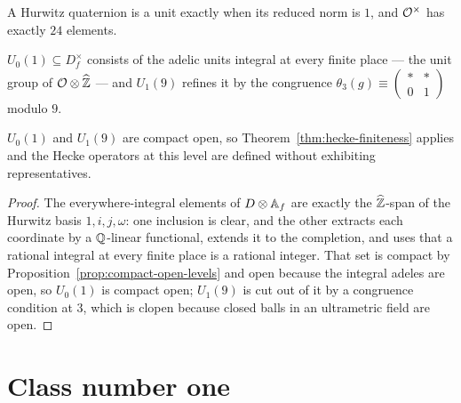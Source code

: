 \begin{proposition}
  \label{prop:hurwitz-units}
  \leanok
  A Hurwitz quaternion is a unit exactly when its reduced norm is $1$, and $\mathcal{O}^\times$ has
  exactly $24$ elements.
\end{proposition}

\begin{definition}
  \label{def:jacobs-levels}
  \leanok
  $U_0(1) \subseteq D_f^\times$ consists of the adelic units integral at every finite place ---
  the unit group of $\mathcal{O} \otimes \widehat{\mathbb{Z}}$ --- and $U_1(9)$ refines it by the congruence
  $\theta_3(g) \equiv \left(\begin{smallmatrix} * & * \\ 0 & 1\end{smallmatrix}\right)$ modulo
  $9$.
\end{definition}

\begin{proposition}
  \label{prop:jacobs-levels-compact-open}
  \leanok
  $U_0(1)$ and $U_1(9)$ are compact open, so Theorem~\ref{thm:hecke-finiteness} applies and the
  Hecke operators at this level are defined without exhibiting representatives.
\end{proposition}

\begin{proof}
  \leanok
  The everywhere-integral elements of $D \otimes \mathbb{A}_f$ are exactly the $\widehat{\mathbb{Z}}$-span of the
  Hurwitz basis $1, i, j, \omega$: one inclusion is clear, and the other extracts each coordinate
  by a $\mathbb{Q}$-linear functional, extends it to the completion, and uses that a rational integral at
  every finite place is a rational integer.  That set is compact by
  Proposition~\ref{prop:compact-open-levels} and open because the integral adeles are open, so
  $U_0(1)$ is compact open; $U_1(9)$ is cut out of it by a congruence condition at $3$, which is
  clopen because closed balls in an ultrametric field are open.
\end{proof}

\section{Class number one}

